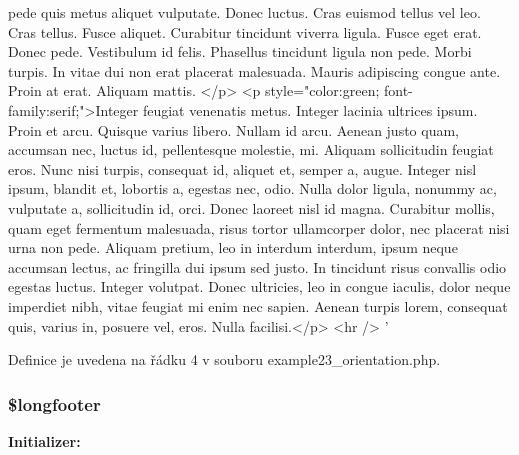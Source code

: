 \begin{DoxyCode}
{       pede quis metus aliquet vulputate. Donec luctus. Cras euismod tellus vel leo. Cras tellus. Fusce aliquet.
       Curabitur tincidunt viverra ligula. Fusce eget erat. Donec pede. Vestibulum id felis. Phasellus tincidunt ligula
       non pede. Morbi turpis. In vitae dui non erat placerat malesuada. Mauris adipiscing congue ante. Proin at
       erat. Aliquam mattis. </p>}
\textcolor{stringliteral}{<p style="color:green; font-family:serif;">Integer feugiat venenatis metus. Integer lacinia ultrices ipsum.
       Proin et arcu. Quisque varius libero. Nullam id arcu. Aenean justo quam, accumsan nec, luctus id,
       pellentesque molestie, mi. Aliquam sollicitudin feugiat eros. Nunc nisi turpis, consequat id, aliquet et, semper a,
       augue. Integer nisl ipsum, blandit et, lobortis a, egestas nec, odio. Nulla dolor ligula, nonummy ac,
       vulputate a, sollicitudin id, orci. Donec laoreet nisl id magna. Curabitur mollis, quam eget fermentum malesuada,
       risus tortor ullamcorper dolor, nec placerat nisi urna non pede. Aliquam pretium, leo in interdum interdum,
       ipsum neque accumsan lectus, ac fringilla dui ipsum sed justo. In tincidunt risus convallis odio egestas
       luctus. Integer volutpat. Donec ultricies, leo in congue iaculis, dolor neque imperdiet nibh, vitae feugiat mi
       enim nec sapien. Aenean turpis lorem, consequat quis, varius in, posuere vel, eros. Nulla facilisi.</p>}
\textcolor{stringliteral}{}
\textcolor{stringliteral}{<hr />}
\textcolor{stringliteral}{}
\textcolor{stringliteral}{'}
\end{DoxyCode}


Definice je uvedena na řádku 4 v souboru example23\-\_\-orientation.\-php.

\hypertarget{example23__orientation_8php_ad95e81ee95bebca56ab645cd10f84716}{
\subsubsection[{\$longfooter}]{\setlength{\rightskip}{0pt plus 5cm}\$longfooter}}\label{example23__orientation_8php_ad95e81ee95bebca56ab645cd10f84716}
{\bfseries Initializer\-:}


